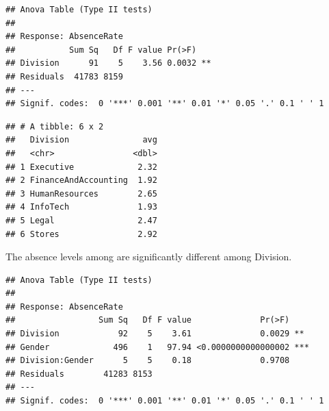 \documentclass[12pt, krantz2,]{krantz}
\makeatletter
\newenvironment{Shaded}{\begin{snugshade}}{\end{snugshade}}
\newcommand{\CommentTok}[1]{\textcolor[rgb]{0.37,0.37,0.37}{\textit{#1}}}
\newcommand{\DataTypeTok}[1]{\textcolor[rgb]{0.27,0.27,0.27}{#1}}
\newcommand{\FloatTok}[1]{\textcolor[rgb]{0.06,0.06,0.06}{#1}}
\newcommand{\KeywordTok}[1]{\textcolor[rgb]{0.27,0.27,0.27}{\textbf{#1}}}
\newcommand{\NormalTok}[1]{#1}
\newcommand{\OperatorTok}[1]{\textcolor[rgb]{0.43,0.43,0.43}{\textbf{#1}}}
\newcommand{\StringTok}[1]{\textcolor[rgb]{0.5,0.5,0.5}{#1}}
\newenvironment{kframe}{%
\medskip{}
\setlength{\fboxsep}{.8em}
 \def\at@end@of@kframe{}%
 \ifinner\ifhmode%
  \def\at@end@of@kframe{\end{minipage}}%
  \begin{minipage}{\columnwidth}%
 \fi\fi%
 \def\FrameCommand##1{\hskip\@totalleftmargin \hskip-\fboxsep
 \colorbox{shadecolor}{##1}\hskip-\fboxsep
     \hskip-\linewidth \hskip-\@totalleftmargin \hskip\columnwidth}%
 \MakeFramed {\advance\hsize-\width
   \@totalleftmargin\z@ \linewidth\hsize
   \@setminipage}}%
 {\par\unskip\endMakeFramed%
 \at@end@of@kframe}
\renewenvironment{Shaded}{\begin{kframe}}{\end{kframe}}
\makeatother
\begin{document}
\begin{verbatim}
## Anova Table (Type II tests)
## 
## Response: AbsenceRate
##           Sum Sq   Df F value Pr(>F)   
## Division      91    5    3.56 0.0032 **
## Residuals  41783 8159                  
## ---
## Signif. codes:  0 '***' 0.001 '**' 0.01 '*' 0.05 '.' 0.1 ' ' 1
\end{verbatim}

\begin{Shaded}
\end{Shaded}

\begin{verbatim}
## # A tibble: 6 x 2
##   Division               avg
##   <chr>                <dbl>
## 1 Executive             2.32
## 2 FinanceAndAccounting  1.92
## 3 HumanResources        2.65
## 4 InfoTech              1.93
## 5 Legal                 2.47
## 6 Stores                2.92
\end{verbatim}

The absence levels among are significantly different among Division.

\begin{Shaded}
\end{Shaded}

\begin{verbatim}
## Anova Table (Type II tests)
## 
## Response: AbsenceRate
##                 Sum Sq   Df F value              Pr(>F)    
## Division            92    5    3.61              0.0029 ** 
## Gender             496    1   97.94 <0.0000000000000002 ***
## Division:Gender      5    5    0.18              0.9708    
## Residuals        41283 8153                                
## ---
## Signif. codes:  0 '***' 0.001 '**' 0.01 '*' 0.05 '.' 0.1 ' ' 1
\end{verbatim}
\end{document}
